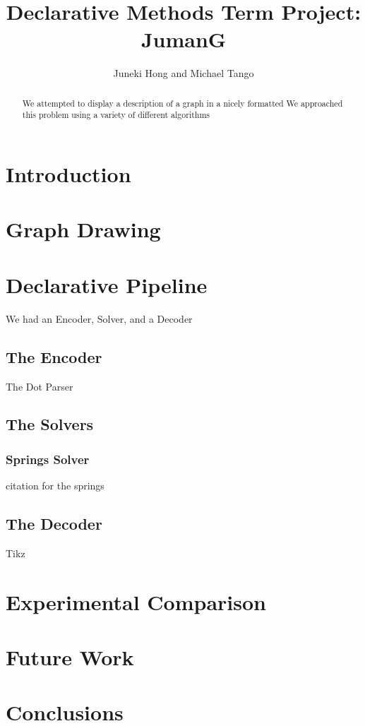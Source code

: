 \documentclass{article}
\title{Declarative Methods Term Project: \\ JumanG}
\author{Juneki Hong and Michael Tango}
\date{}
\begin{document}
\maketitle

\begin{abstract}
We attempted to display a description of a graph in a nicely formatted 
We approached this problem using a variety of different algorithms
\end{abstract}

\section{Introduction}

\section{Graph Drawing}


\section{Declarative Pipeline}

We had an Encoder, Solver, and a Decoder

\subsection{The Encoder}
The Dot Parser

\subsection{The Solvers}


\subsubsection{Springs Solver}
citation for the springs\cite{springs}


\subsection{The Decoder}
Tikz


\section{Experimental Comparison}


\section{Future Work}


\section{Conclusions}



\end{document}
